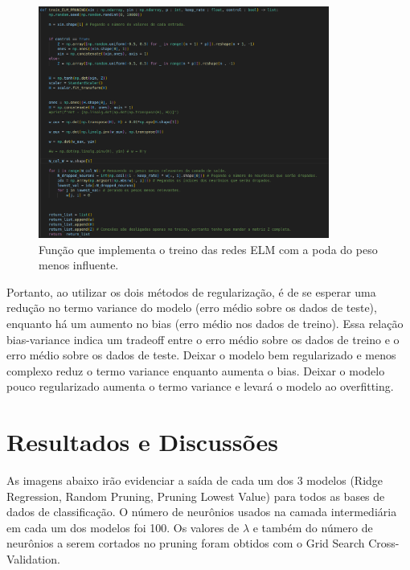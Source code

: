 \documentclass{article}
\begin{document}
\begin{figure}[h]

    \centering
    \includegraphics[height=3in]{prun_lowest_val.png}
    \caption{Função que implementa o treino das redes ELM com a poda do peso menos influente.}
    \label{fig:example}
    
\end{figure}

\vspace{15pt}

Portanto, ao utilizar os dois métodos de regularização, é de se esperar uma redução no termo variance do modelo (erro médio sobre os dados de teste), enquanto há um aumento no bias (erro médio nos dados de treino). Essa relação bias-variance indica um tradeoff entre o erro médio sobre os dados de treino e o erro médio sobre os dados de teste. Deixar o modelo bem regularizado e menos complexo reduz o termo variance enquanto aumenta o bias. Deixar o modelo pouco regularizado aumenta o termo variance e levará o modelo ao overfitting.

\newpage

\section*{Resultados e Discussões}

\vspace{15pt}

As imagens abaixo irão evidenciar a saída de cada um dos 3 modelos (Ridge Regression, Random Pruning, Pruning Lowest Value) para todos as bases de dados de classificação. O número de neurônios usados na camada intermediária em cada um dos modelos foi 100. Os valores de $\lambda$  e também do número de neurônios a serem cortados no pruning foram obtidos com o Grid Search Cross-Validation.
\end{document}
